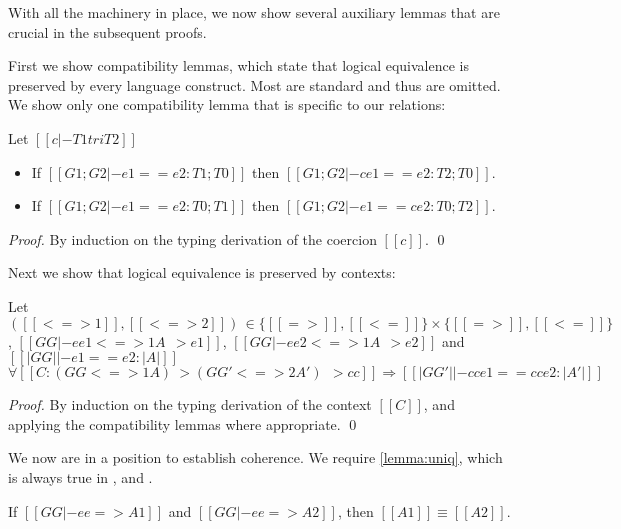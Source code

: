 With all the machinery in place, we now show several auxiliary
lemmas that are crucial in the subsequent proofs. %

First we show compatibility lemmas, which state that logical equivalence
is preserved by every language construct. Most are standard and thus are
omitted. We show only one compatibility lemma that is specific to our relations:

\begin{lemma}   \label{lemma:co-compa}
  Let $[[c |- T1 tri T2]]$
  \begin{itemize}
  \item If $[[G1 ; G2 |- e1 == e2 : T1 ; T0]]$ then $[[G1 ; G2 |- c e1 == e2 : T2 ; T0]]$.
  \item If $[[G1 ; G2 |- e1 == e2 : T0 ; T1]]$ then $[[G1 ; G2 |- e1 == c e2 : T0 ; T2]]$.
  \end{itemize}
\end{lemma}
\begin{proof}
  By induction on the typing derivation of the coercion $[[c]]$. \qed
\end{proof}

Next we show that logical equivalence is preserved by \name contexts:

\begin{lemma}[Congruence] \label{lemma:cong}
  Let $ ([[<=>1]], [[<=>2]]) \, \in \{ [[=>]] , [[<=]] \} \times \{ [[=>]] , [[<=]] \}$, $[[GG |- ee1 <=>1 A ~~> e1]]$,
  $[[GG |- ee2 <=>1 A ~~> e2]]$ and $[[|GG| |- e1 == e2 : |A|]]$
  \[
    \forall [[C : (GG <=>1 A) ~> (GG' <=>2 A') ~~> cc]] \Longrightarrow [[|GG'| |- cc{e1} == cc{e2} : |A'|]]
  \]
\end{lemma}
\begin{proof}
  By induction on the typing derivation of the context $[[C]]$, and applying
  the compatibility lemmas where appropriate. \qed
\end{proof}


We now are in a position to establish coherence. We
require \cref{lemma:uniq}, which is always true in \oname, \fname and \name.

\begin{mtheorem} \label{lemma:uniq}
  If $[[GG |- ee => A1]]$ and $[[GG |- ee => A2]]$, then $[[A1]] \equiv [[A2]]$.
\end{mtheorem}

